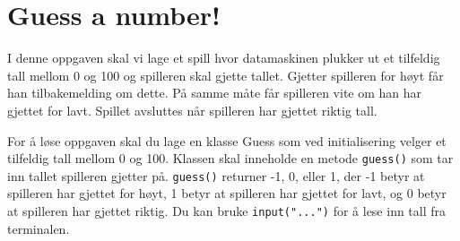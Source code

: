 \documentclass[12pt, norsk, a4paper]{exam}
\begin{document}
\section{Guess a number!}
I denne oppgaven skal vi lage et spill hvor
datamaskinen plukker ut et tilfeldig tall mellom 0 og 100 og spilleren skal
gjette tallet. Gjetter spilleren for høyt får han tilbakemelding om dette. På
samme måte får spilleren vite om han har gjettet for lavt. Spillet avsluttes når
spilleren har gjettet riktig tall.

For å løse oppgaven skal du lage en klasse Guess som ved initialisering velger
et tilfeldig tall mellom 0 og 100. Klassen skal inneholde en metode
\texttt{guess()} som tar inn tallet spilleren gjetter på. \texttt{guess()} returner
-1, 0, eller 1, der -1 betyr at spilleren har gjettet for høyt, 1 betyr at
spilleren har gjettet for lavt, og 0 betyr at spilleren har gjettet riktig. Du
kan bruke \texttt{input("...")} for å lese inn tall fra terminalen.
\end{document}
